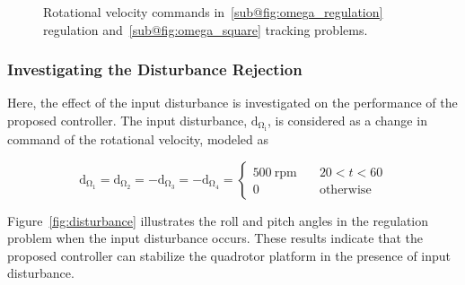 \documentclass[3p]{elsarticle}
\begin{document}
\begin{figure}[H]
    \caption{Rotational velocity  commands in~\ref{sub@fig:omega_regulation} regulation and~\ref{sub@fig:omega_square} tracking problems.}
    \label{fig:omega}
\end{figure}
\subsubsection{Investigating the Disturbance Rejection}\label{sec:disturbance}
\noindent Here, the effect of the input disturbance is investigated on the performance of the proposed controller.
The input disturbance, $\mathrm{d_{\Omega_i}}$, is considered as a change in command of the rotational velocity, modeled as %

\begin{equation}
    \mathrm{d_{\Omega_1}} = \mathrm{d_{\Omega_2}} = -\mathrm{d_{\Omega_3}} = -\mathrm{d_{\Omega_4}} = \begin{cases}
        500~{\mathrm{rpm}} \quad &20<t<60\\
        0 \quad &\mathrm{otherwise}
    \end{cases}
\end{equation}

Figure~\ref{fig:disturbance} illustrates the roll and pitch angles in the regulation problem when the input disturbance occurs. These results indicate that the proposed controller can stabilize the quadrotor platform in the presence of input disturbance.



\end{document}
